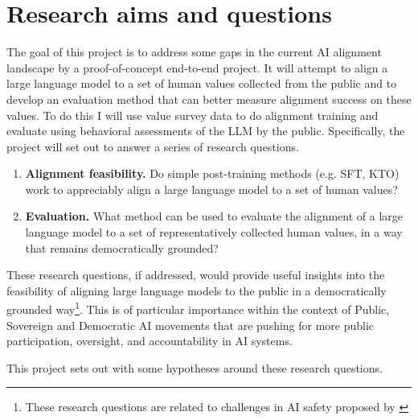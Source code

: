 \label{app:proposal}
\section{Research aims and questions}

The goal of this project is to address some gaps in the current AI alignment landscape by a proof-of-concept end-to-end project. It will attempt to align a large language model to a set of human values collected from the public and to develop an evaluation method that can better measure alignment success on these values. To do this I will use value survey data to do alignment training and evaluate using behavioral assessments of the LLM by the public. Specifically, the project will set out to answer a series of research questions.

\begin{enumerate}[label=\textbf{RQ\arabic*:}, ref=RQ\arabic*, leftmargin=*, itemsep=1em]
  \item \textbf{Alignment feasibility.} Do simple post-training methods (e.g. SFT, KTO) work to appreciably align a large language model to a set of human values? \label{rq1}

  \item \textbf{Evaluation.} What method can be used to evaluate the alignment of a large language model to a set of representatively collected human values, in a way that remains democratically grounded? \label{rq2}
\end{enumerate}

These research questions, if addressed, would provide useful insights into the feasibility of aligning large language models to the public in a democratically grounded way\footnote{These research questions are related to  challenges in AI safety proposed by \cite{anwarFoundationalChallengesAssuring2024}}. This is of particular importance within the context of Public, Sovereign and Democratic AI \cite{daleSovereignAI20252025,nfeltSovereignRemediesAI2025,publicaiPublicAIWhite2024,ovadyaDemocraticAIPossible2025} movements that are pushing for more public participation, oversight, and accountability in AI systems.

This project sets out with some hypotheses around these research questions.


